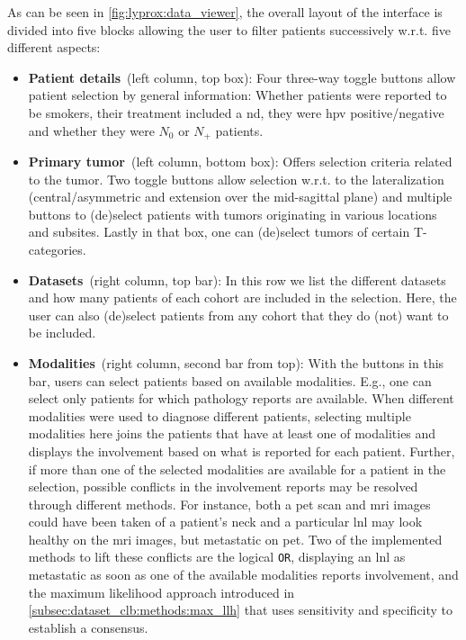 \documentclass[\relativeRoot/main.tex]{subfiles}
\begin{document}
As can be seen in \cref{fig:lyprox:data_viewer}, the overall layout  of the interface is divided into five blocks allowing the user to filter patients successively w.r.t. five different aspects:

\begin{itemize}
    \item \textbf{Patient details}~(left column, top box): Four three-way toggle buttons allow patient selection by general information: Whether patients were reported to be smokers, their treatment included a \acrlong{nd}, they were \gls{hpv} positive/negative and whether they were $N_0$ or $N_+$ patients.
    \item \textbf{Primary tumor}~(left column, bottom box): Offers selection criteria related to the tumor. Two toggle buttons allow selection w.r.t. to the lateralization (central/asymmetric and extension over the mid-sagittal plane) and multiple buttons to (de)select patients with tumors originating in various locations and subsites. Lastly in that box, one can (de)select tumors of certain T-categories.
    \item \textbf{Datasets}~(right column, top bar): In this row we list the different datasets and how many patients of each cohort are included in the selection. Here, the user can also (de)select patients from any cohort that they do (not) want to be included.
    \item \textbf{Modalities}~(right column, second bar from top): With the buttons in this bar, users can select patients based on available modalities. E.g., one can select only patients for which pathology reports are available. When different modalities were used to diagnose different patients, selecting multiple modalities here joins the patients that have at least one of modalities and displays the involvement based on what is reported for each patient. Further, if more than one of the selected modalities are available for a patient in the selection, possible conflicts in the involvement reports may be resolved through different methods. For instance, both a \gls{pet} scan and \gls{mri} images could have been taken of a patient's neck and a particular \gls{lnl} may look healthy on the \gls{mri} images, but metastatic on \gls{pet}. Two of the implemented methods to lift these conflicts are the logical \texttt{OR}, displaying an \gls{lnl} as metastatic as soon as one of the available modalities reports involvement, and the maximum likelihood approach introduced in \cref{subsec:dataset_clb:methods:max_llh} that uses sensitivity and specificity to establish a consensus.

\end{itemize}
\end{document}
